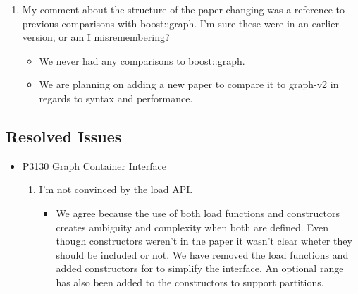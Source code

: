 \begin{itemize}
            \begin{enumerate}
                  \item My comment about the structure of the paper changing was a reference to previous comparisons with boost::graph. 
                        I'm sure these were in an earlier version, or am I misremembering?
                  \begin{itemize}
                        \item We never had any comparisons to boost::graph. 
                        \item We are planning on adding a new paper to compare it to graph-v2 in regards to syntax and performance.
                  \end{itemize}
            \end{enumerate}
\end{itemize}

\subsection{Resolved Issues}
\begin{itemize}
      \item \href{https://www.wg21.link/P3130}{P3130 Graph Container Interface}
            \begin{enumerate}
                  \item I'm not convinced by the load API.
                        \begin{itemize}
                              \item We agree because the use of both load functions and constructors creates ambiguity and complexity when both are defined.
                                    Even though constructors weren't in the paper it wasn't clear wheter they should be included or not.
                                    We have removed the load functions and added constructors for  to simplify the interface.
                                    An optional  range has also been added to the constructors to support partitions.
                        \end{itemize}
            \end{enumerate}
\end{itemize}

